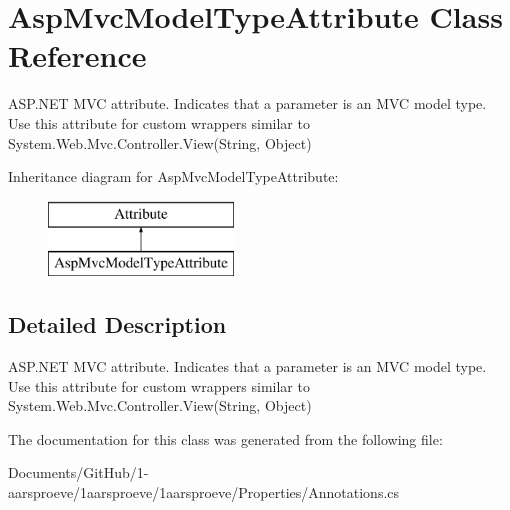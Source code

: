 \hypertarget{class_asp_mvc_model_type_attribute}{}\section{Asp\+Mvc\+Model\+Type\+Attribute Class Reference}
\label{class_asp_mvc_model_type_attribute}


A\+S\+P.\+N\+E\+T M\+V\+C attribute. Indicates that a parameter is an M\+V\+C model type. Use this attribute for custom wrappers similar to {\ttfamily System.\+Web.\+Mvc.\+Controller.\+View(\+String, Object)}  


Inheritance diagram for Asp\+Mvc\+Model\+Type\+Attribute\+:\begin{figure}[H]
\begin{center}
\leavevmode
\includegraphics[height=2.000000cm]{class_asp_mvc_model_type_attribute}
\end{center}
\end{figure}


\subsection{Detailed Description}
A\+S\+P.\+N\+E\+T M\+V\+C attribute. Indicates that a parameter is an M\+V\+C model type. Use this attribute for custom wrappers similar to {\ttfamily System.\+Web.\+Mvc.\+Controller.\+View(\+String, Object)} 



The documentation for this class was generated from the following file\+:\begin{DoxyCompactItemize}
\item 
Documents/\+Git\+Hub/1-\/aarsproeve/1aarsproeve/1aarsproeve/\+Properties/Annotations.\+cs\end{DoxyCompactItemize}

